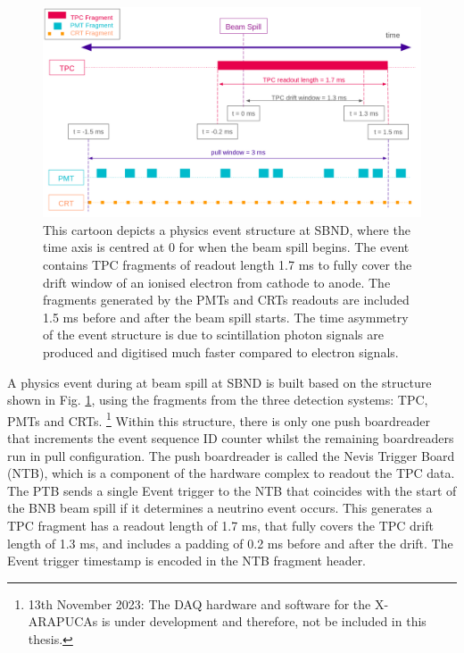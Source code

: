 \begin{figure}[htbp!] 
\centering    
\includegraphics[width=1.0\textwidth]{SBND_Event_Structure}
\caption[SBNDEventStructure]{
This cartoon depicts a physics event structure at SBND, where the time axis is centred at 0 for when the beam spill begins. 
The event contains TPC fragments of readout length 1.7 ms to fully cover the drift window of an ionised electron from cathode to anode. 
The fragments generated by the PMTs and CRTs readouts are included 1.5 ms before and after the beam spill starts. 
The time asymmetry of the event structure is due to scintillation photon signals are produced and digitised much faster compared to electron signals.}
\label{fig:SBNDEventStructure}
\end{figure}

A physics event during at beam spill at SBND is built based on the structure shown in Fig. \ref{fig:SBNDEventStructure}, using the fragments from the three detection systems: TPC, PMTs and CRTs.
\footnote{13th November 2023: The DAQ hardware and software for the X-ARAPUCAs is under development and therefore, not be included in this thesis. }
Within this structure, there is only one push boardreader that increments the event sequence ID counter whilst the remaining boardreaders run in pull configuration.
The push boardreader is called the Nevis Trigger Board (NTB), which is a component of the hardware complex to readout the TPC data. 
The PTB sends a single Event trigger to the NTB that coincides with the start of the BNB beam spill if it determines a neutrino event occurs.
This generates a TPC fragment has a readout length of 1.7 ms, that fully covers the TPC drift length of 1.3 ms, and includes a padding of 0.2 ms before and after the drift.
The Event trigger timestamp is encoded in the NTB fragment header.

